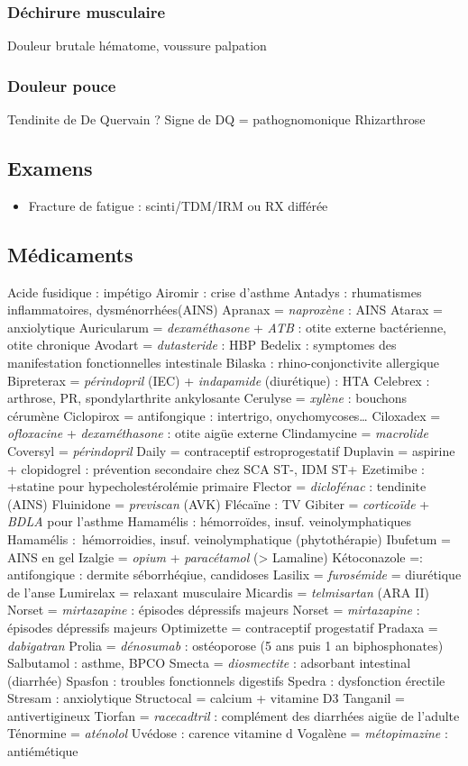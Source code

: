 \documentclass[11pt]{article}
\begin{document}
\subsubsection{Déchirure musculaire}
\label{sec:org202b67b}
Douleur brutale \textpm{} hématome, voussure palpation
\subsubsection{Douleur pouce}
\label{sec:orge658d40}
Tendinite de De Quervain ? Signe de DQ = pathognomonique
Rhizarthrose
\subsection{Examens}
\label{sec:org9ab104d}
\begin{itemize}
\item Fracture de fatigue : scinti/TDM/IRM ou RX différée
\end{itemize}
\subsection{Médicaments}
\label{sec:orgcad5031}
Acide fusidique : impétigo
Airomir : crise d'asthme
Antadys : rhumatismes inflammatoires, dysménorrhées(AINS)
Apranax = \emph{naproxène} : AINS
Atarax = anxiolytique
Auricularum = \emph{dexaméthasone} + \emph{ATB} : otite externe bactérienne, otite chronique
Avodart = \emph{dutasteride} : HBP
Bedelix : symptomes des manifestation fonctionnelles intestinale
Bilaska : rhino-conjonctivite allergique
Bipreterax = \emph{périndopril} (IEC) + \emph{indapamide} (diurétique) : HTA
Celebrex : arthrose, PR, spondylarthrite ankylosante
Cerulyse = \emph{xylène} : bouchons cérumène
Ciclopirox = antifongique : intertrigo, onychomycoses\ldots{}
Ciloxadex = \emph{ofloxacine} + \emph{dexaméthasone} : otite aigüe externe
Clindamycine = \emph{macrolide}
Coversyl = \emph{périndopril}
Daily = contraceptif estroprogestatif
Duplavin = aspirine + clopidogrel : prévention secondaire chez SCA ST-, IDM ST+
Ezetimibe : +statine pour hypecholestérolémie primaire
Flector = \emph{diclofénac} : tendinite (AINS)
Fluinidone = \emph{previscan} (AVK)
Flécaïne : TV
Gibiter = \emph{corticoïde} + \emph{BDLA} pour l'asthme
Hamamélis : hémorroïdes, insuf. veinolymphatiques
Hamamélis : hémorroidies, insuf. veinolymphatique (phytothérapie)
Ibufetum = AINS en gel
Izalgie = \emph{opium} + \emph{paracétamol} (> Lamaline)
Kétoconazole =: antifongique  : dermite séborrhéqiue, candidoses
Lasilix = \emph{furosémide} = diurétique de l'anse
Lumirelax = relaxant musculaire
Micardis = \emph{telmisartan} (ARA II)
Norset = \emph{mirtazapine} : épisodes dépressifs majeurs
Norset = \emph{mirtazapine} : épisodes dépressifs majeurs
Optimizette = contraceptif progestatif
Pradaxa = \emph{dabigatran}
Prolia = \emph{dénosumab} : ostéoporose (5 ans puis 1 an biphosphonates)
Salbutamol : asthme, BPCO
Smecta = \emph{diosmectite} : adsorbant intestinal (diarrhée)
Spasfon : troubles fonctionnels digestifs
Spedra : dysfonction érectile
Stresam : anxiolytique
Structocal = calcium + vitamine D3
Tanganil = antivertigineux
Tiorfan = \emph{racecadtril} : complément des diarrhées aigüe de l'adulte
Ténormine = \emph{aténolol}
Uvédose : carence vitamine d
Vogalène = \emph{métopimazine} : antiémétique
\end{document}
